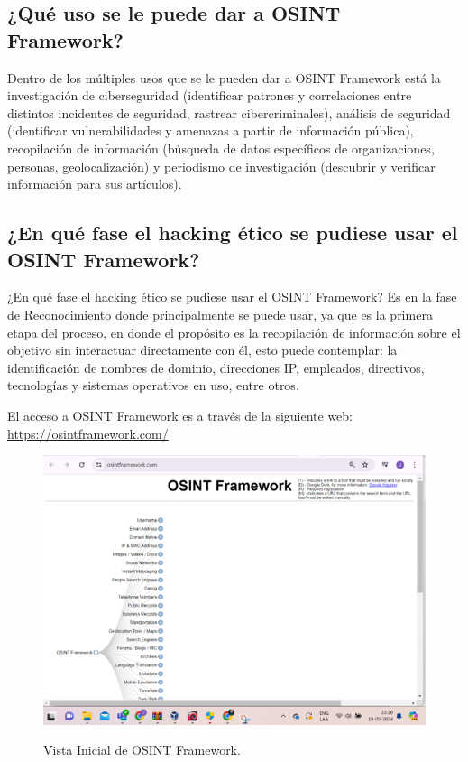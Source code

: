 \documentclass[stu, 11pt, letterpaper, donotrepeattitle, floatsintext, natbib]{apa7}
\begin{document}
\subsection{¿Qué uso se le puede dar a OSINT Framework?}

Dentro de los múltiples usos que se le pueden dar a OSINT Framework está la investigación de ciberseguridad (identificar patrones y correlaciones entre distintos incidentes de seguridad, rastrear cibercriminales), análisis de seguridad (identificar vulnerabilidades y amenazas a partir de información pública), recopilación de información (búsqueda de datos específicos de organizaciones, personas, geolocalización) y periodismo de investigación (descubrir y verificar información para sus artículos).

\subsection{¿En qué fase el hacking ético se pudiese usar el OSINT Framework?}

¿En qué fase el hacking ético se pudiese usar el OSINT Framework?
Es en la fase de Reconocimiento donde principalmente se puede usar, ya que es la primera etapa del proceso, en donde el propósito es la recopilación de información sobre el objetivo sin interactuar directamente con él, esto puede contemplar: la identificación de nombres de dominio, direcciones IP, empleados, directivos, tecnologías y sistemas operativos en uso, entre otros.

El acceso a OSINT Framework es a través de la siguiente web: \url{https://osintframework.com/}

\begin{figure}[H]
\centering
\caption{Vista Inicial de OSINT Framework.}
\includegraphics[width=0.75\linewidth]{osi1.png} %
\label{fig:OverallEffect}
\end{figure}
\end{document}
